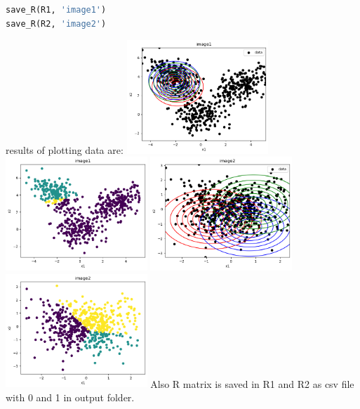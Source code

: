 \documentclass[12pt]{article}
\begin{document}
\begin{qsolve}
\begin{lstlisting}[language=Python,caption={Simulation Question 2.},label={code:Simulation Question 2.}]
save_R(R1, 'image1')
save_R(R2, 'image2')
    \end{lstlisting}
    results of plotting data are:
    \tcblower
    \centering
    \includegraphics[width=0.4\textwidth]{outputs/output3.png}
    \label{fig:fig3}
    \splitqsolve
    \centering
    \includegraphics[width=0.4\textwidth]{outputs/output4.png}
    \label{fig:fig4}
    \includegraphics[width=0.4\textwidth]{outputs/output5.png}
    \label{fig:fig5}
    \includegraphics[width=0.4\textwidth]{outputs/output6.png}
    \label{fig:fig6}
    \tcblower
    Also R matrix is saved in R1 and R2 as csv file with 0 and 1 in output folder.
\end{qsolve}
\end{document}
